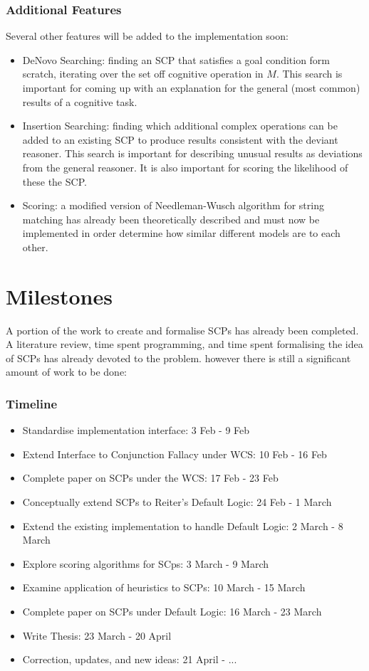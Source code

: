 \documentclass{article}
\begin{document}
\subsubsection{Additional Features}
Several other features will be added to the implementation soon:
\begin{itemize}
\item DeNovo Searching: finding an SCP that satisfies a goal condition form scratch, iterating over the set off cognitive operation in $M$. This search is important for coming up with an explanation for the general (most common) results of a cognitive task.
\item Insertion Searching: finding which additional complex operations can be added to an existing SCP to produce results consistent with the deviant reasoner. This search is important for describing unusual results as deviations from the general reasoner. It is also important for scoring the likelihood of these the SCP.
\item Scoring: a modified version of Needleman-Wusch algorithm for string matching has already been theoretically described and must now be implemented in order determine how similar different models are to each other.
\end{itemize}
\newpage

\section{Milestones}
A portion of the work to create and formalise SCPs has already been completed. A literature review, time spent programming, and time spent formalising the idea of SCPs has already devoted to the problem. however there is still a significant amount of work to be done:
\subsubsection*{Timeline}
\begin{itemize}
\item Standardise implementation interface: 3 Feb - 9 Feb
\item Extend Interface to Conjunction Fallacy under WCS: 10 Feb - 16 Feb
\item Complete paper on SCPs under the WCS: 17 Feb - 23 Feb
\item Conceptually extend SCPs to Reiter's Default Logic: 24 Feb - 1 March
\item Extend the existing implementation to handle Default Logic: 2 March - 8 March
\item Explore scoring algorithms for SCps: 3 March - 9 March
\item Examine application of heuristics to SCPs: 10 March - 15 March
\item Complete paper on SCPs under Default Logic: 16 March - 23 March
\item Write Thesis: 23 March - 20 April
\item Correction, updates, and new ideas: 21 April - ...
\end{itemize}
\end{document}
